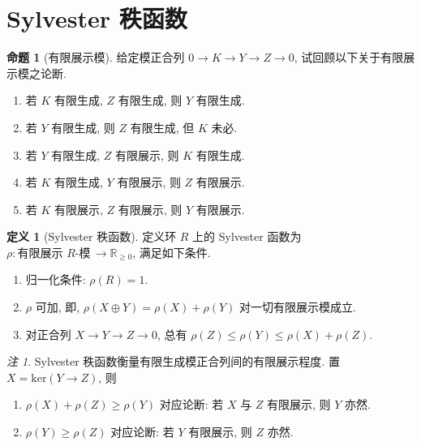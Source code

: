 \documentclass{MainStyle}
\theoremstyle{definition}
\theoremstyle{definition}
\theoremstyle{definition}
\newtheorem{definition}{定义}
\theoremstyle{definition}
\newtheorem{proposition}{命题}
\theoremstyle{definition}
\theoremstyle{definition}
\theoremstyle{definition}
\theoremstyle{remark}
\newtheorem{remark}{注}
\theoremstyle{remark}
\begin{document}
\maketitle
\tableofcontents

\section{Sylvester 秩函数}

\begin{proposition}[有限展示模]
    给定模正合列 $0\to K\to Y\to Z\to 0$, 试回顾以下关于有限展示模之论断.
    \begin{enumerate}
        \item 若 $K$ 有限生成, $Z$ 有限生成, 则 $Y$ 有限生成.
        \item[1'.] 若 $Y$ 有限生成, 则 $Z$ 有限生成, 但 $K$ 未必.
        \item 若 $Y$ 有限生成, $Z$ 有限展示, 则 $K$ 有限生成.
        \item 若 $K$ 有限生成, $Y$ 有限展示, 则 $Z$ 有限展示.
        \item 若 $K$ 有限展示, $Z$ 有限展示, 则 $Y$ 有限展示.
    \end{enumerate}
\end{proposition}

\begin{definition}[Sylvester 秩函数]
    定义环 $R$ 上的 Sylvester 函数为 $\rho: \text{有限展示 $R$-模}\,\to \mathbb R_{\geq 0}$, 满足如下条件.
    \begin{enumerate}
        \item 归一化条件: $\rho(R)=1$.
        \item $\rho$ 可加, 即, $\rho(X\oplus Y)=\rho(X)+\rho(Y)$ 对一切有限展示模成立.
        \item 对正合列 $X\to Y\to Z\to 0$, 总有 $\rho(Z)\leq \rho(Y)\leq \rho(X)+\rho(Z)$.
    \end{enumerate}
\end{definition}

\begin{remark}
    Sylvester 秩函数衡量有限生成模正合列间的有限展示程度. 置 $X=\mathrm{ker}(Y\to Z)$, 则
    \begin{enumerate}
        \item $\rho(X)+\rho(Z)\geq \rho(Y)$ 对应论断: 若 $X$ 与 $Z$ 有限展示, 则 $Y$ 亦然.
        \item $\rho(Y)\geq\rho(Z)$ 对应论断: 若 $Y$ 有限展示, 则 $Z$ 亦然.
    \end{enumerate}
\end{remark}
\end{document}
